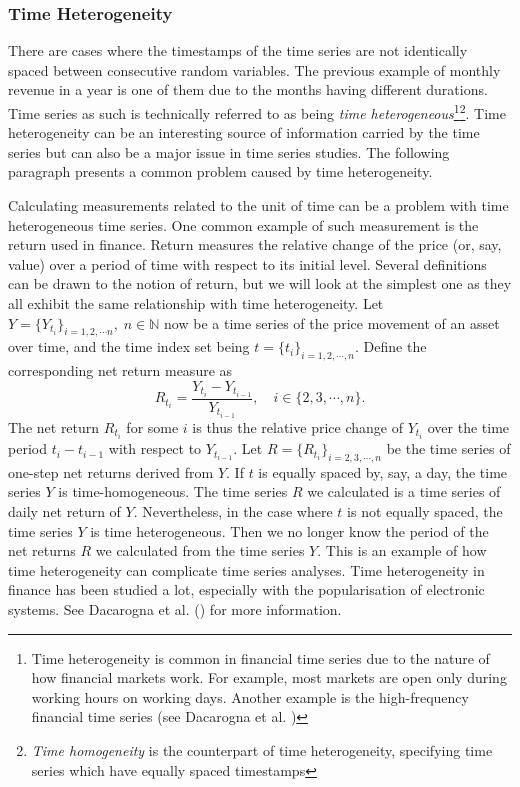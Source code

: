 \subsubsection{Time Heterogeneity}
There are cases where the timestamps of the time series are not identically spaced between consecutive random variables. The previous example of monthly revenue in a year is one of them due to the months having different durations. Time series as such is technically referred to as being \textit{time heterogeneous}\footnote{Time heterogeneity is common in financial time series due to the nature of how financial markets work. For example, most markets are open only during working hours on working days. Another example is the high-frequency financial time series (see Dacarogna et al. \citeyear{genccay2001introduction})}\footnote{\textit{Time homogeneity} is the counterpart of time heterogeneity, specifying time series which have equally spaced timestamps}. Time heterogeneity can be an interesting source of information carried by the time series but can also be a major issue in time series studies. The following paragraph presents a common problem caused by time heterogeneity.

Calculating measurements related to the unit of time can be a problem with time heterogeneous time series. One common example of such measurement is the return used in finance. Return measures the relative change of the price (or, say, value) over a period of time with respect to its initial level. Several definitions can be drawn to the notion of return, but we will look at the simplest one as they all exhibit the same relationship with time heterogeneity. Let $Y = \{ Y_{t_i} \}_{i = 1, 2, \cdots n}, \; n \in \mathbb{N}$ now be a time series of the price movement of an asset over time, and the time index set being $t = \{ t_i \}_{i = 1, 2, \cdots, n}$. Define the corresponding net return measure as
\begin{equation*}
R_{t_i} = \frac{Y_{t_i} - Y_{t_{i-1}}}{Y_{t_{i-1}}}, \quad i \in \{2, 3, \cdots, n \}.
\end{equation*}
The net return $R_{t_i}$ for some $i$ is thus the relative price change of $Y_{t_i}$ over the time period $t_i - t_{i-1}$ with respect to $Y_{t_{i-1}}$. Let $R = \{ R_{t_i} \}_{i = 2, 3, \cdots, n}$ be the time series of one-step net returns derived from $Y$. If $t$ is equally spaced by, say, a day, the time series $Y$ is time-homogeneous. The time series $R$ we calculated is a time series of daily net return of $Y$. Nevertheless, in the case where $t$ is not equally spaced, the time series $Y$ is time heterogeneous. Then we no longer know the period of the net returns $R$ we calculated from the time series $Y$. This is an example of how time heterogeneity can complicate time series analyses. Time heterogeneity in finance has been studied a lot, especially with the popularisation of electronic systems. See Dacarogna et al. (\citeyear{genccay2001introduction}) for more information.

